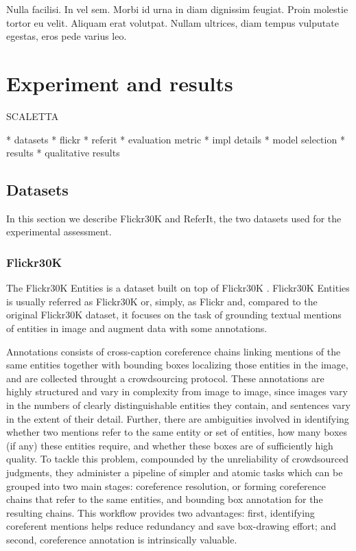 \begin{savequote}[75mm]
Nulla facilisi. In vel sem. Morbi id urna in diam dignissim feugiat. Proin molestie tortor eu velit. Aliquam erat volutpat. Nullam ultrices, diam tempus vulputate egestas, eros pede varius leo.
\end{savequote}

\chapter{Experiment and results}

SCALETTA

* datasets
  * flickr
  * referit
* evaluation metric
* impl details
* model selection
* results
* qualitative results

\section{Datasets}
\label{sec:datasets}

In this section we describe Flickr30K and ReferIt, the two datasets
used for the experimental assessment. 

\subsection{Flickr30K}

The Flickr30K Entities  is a dataset
built on top of Flickr30K . Flickr30K Entities is usually referred as
Flickr30K or, simply, as Flickr and, compared to the original
Flickr30K dataset, it focuses on the task of grounding textual
mentions of entities in image and augment data with some annotations.

Annotations consists of cross-caption coreference chains linking
mentions of the same entities together with bounding boxes localizing
those entities in the image, and are collected throught a
crowdsourcing protocol. These annotations are highly structured and
vary in complexity from image to image, since images vary in the
numbers of clearly distinguishable entities they contain, and
sentences vary in the extent of their detail. Further, there are
ambiguities involved in identifying whether two mentions refer to the
same entity or set of entities, how many boxes (if any) these entities
require, and whether these boxes are of sufficiently high quality. To
tackle this problem, compounded by the unreliability of crowdsourced
judgments, they administer a pipeline of simpler and atomic tasks
which can be grouped into two main stages: coreference resolution, or
forming coreference chains that refer to the same entities, and
bounding box annotation for the resulting chains. This workflow
provides two advantages: first, identifying coreferent mentions helps
reduce redundancy and save box-drawing effort; and second, coreference
annotation is intrinsically valuable.

